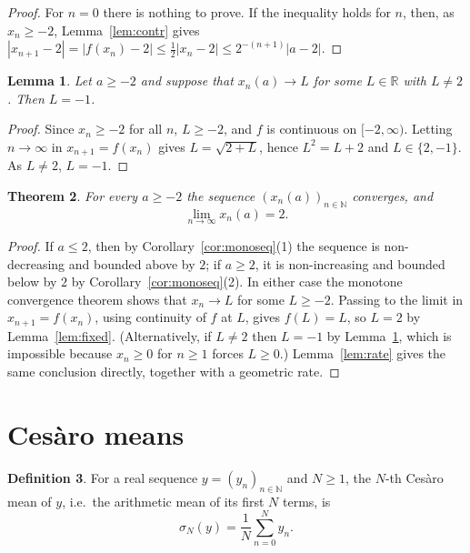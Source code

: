 \documentclass[11pt]{amsart}
\newtheorem{theorem}{Theorem}[section]
\newtheorem{lemma}[theorem]{Lemma}
\theoremstyle{definition}
\newtheorem{definition}[theorem]{Definition}
\begin{document}
\begin{proof}
For $n=0$ there is nothing to prove. If the inequality holds for $n$, then,
as $x_n\ge -2$, Lemma~\ref{lem:contr} gives
$|x_{n+1}-2|=|f(x_n)-2|\le\frac12|x_n-2|\le 2^{-(n+1)}|a-2|$.
\end{proof}

\begin{lemma}\label{lem:limcand}
Let $a\ge -2$ and suppose that $x_n(a)\to L$ for some $L\in\mathbb R$ with
$L\ne 2$. Then $L=-1$.
\end{lemma}

\begin{proof}
Since $x_n\ge -2$ for all $n$, $L\ge -2$, and $f$ is continuous on
$[-2,\infty)$. Letting $n\to\infty$ in $x_{n+1}=f(x_n)$ gives $L=\sqrt{2+L}$,
hence $L^2=L+2$ and $L\in\{2,-1\}$. As $L\ne 2$, $L=-1$.
\end{proof}

\begin{theorem}\label{thm:main}
For every $a\ge -2$ the sequence $(x_n(a))_{n\in\mathbb N}$ converges, and
\[
  \lim_{n\to\infty}x_n(a)=2.
\]
\end{theorem}

\begin{proof}
If $a\le 2$, then by Corollary~\ref{cor:monoseq}(1) the sequence is
non-decreasing and bounded above by $2$; if $a\ge 2$, it is non-increasing
and bounded below by $2$ by Corollary~\ref{cor:monoseq}(2). In either case the
monotone convergence theorem shows that $x_n\to L$ for some $L\ge -2$.
Passing to the limit in $x_{n+1}=f(x_n)$, using continuity of $f$ at $L$,
gives $f(L)=L$, so $L=2$ by Lemma~\ref{lem:fixed}. (Alternatively, if
$L\ne 2$ then $L=-1$ by Lemma~\ref{lem:limcand}, which is impossible because
$x_n\ge 0$ for $n\ge 1$ forces $L\ge 0$.) Lemma~\ref{lem:rate} gives the
same conclusion directly, together with a geometric rate.
\end{proof}

\section{Ces\`aro means}\label{sec:cesaro}

\begin{definition}\label{def:cesaro}
For a real sequence $y=(y_n)_{n\in\mathbb N}$ and $N\ge 1$, the $N$-th
Ces\`aro mean of $y$, i.e.\ the arithmetic mean of its first $N$ terms, is
\[
  \sigma_N(y)=\frac1N\sum_{n=0}^{N}y_n .
\]
\end{definition}
\end{document}

